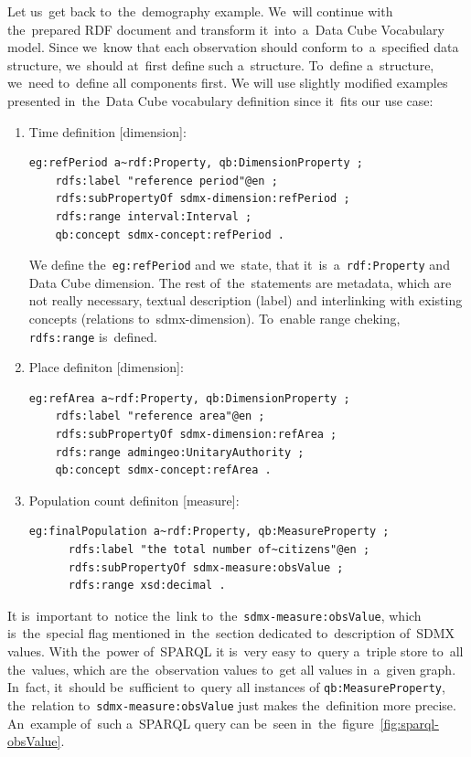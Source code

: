 Let us~get back to~the~demography example. We~will continue with the~prepared RDF
document and transform it~into~a~Data Cube Vocabulary model. Since we~know that each
observation should conform to~a~specified data structure, we~should at~first define
such a~structure. To~define a~structure, we~need to~define all components first.
We will use slightly modified examples presented in~the~Data Cube vocabulary
definition since it~fits our use case:

\begin{enumerate}
\item Time definition [dimension]:

\begin{verbatim}
eg:refPeriod a~rdf:Property, qb:DimensionProperty ;
    rdfs:label "reference period"@en ;
    rdfs:subPropertyOf sdmx-dimension:refPeriod ;
    rdfs:range interval:Interval ;
    qb:concept sdmx-concept:refPeriod .
\end{verbatim}

We define the~\texttt{eg:refPeriod} and we~state, that it~is~a~\texttt{rdf:Property} and Data Cube dimension.
The rest of~the~statements are metadata, which are not really necessary, textual description
(label) and interlinking with existing concepts (relations to~sdmx-dimension). To~enable range
cheking, \texttt{rdfs:range} is~defined.

\item Place definiton [dimension]:

\begin{verbatim}
eg:refArea a~rdf:Property, qb:DimensionProperty ;
    rdfs:label "reference area"@en ;
    rdfs:subPropertyOf sdmx-dimension:refArea ;
    rdfs:range admingeo:UnitaryAuthority ;
    qb:concept sdmx-concept:refArea .
\end{verbatim}

\item Population count definiton [measure]:
\begin{verbatim}
eg:finalPopulation a~rdf:Property, qb:MeasureProperty ;
      rdfs:label "the total number of~citizens"@en ;
      rdfs:subPropertyOf sdmx-measure:obsValue ;
      rdfs:range xsd:decimal .
\end{verbatim}
\end{enumerate}

It is~important to~notice the~link to~the~\texttt{sdmx-measure:obsValue}, which is~the~special flag
mentioned in~the~section dedicated to~description of~SDMX values. With the~power of~SPARQL
it is~very easy to~query a~triple store to~all the~values, which are the~observation values to~get
all values in~a~given graph. In~fact, it~should be~sufficient to~query all instances of
\texttt{qb:MeasureProperty}, the~relation to~\texttt{sdmx-measure:obsValue} just makes the~definition
more precise. An~example of~such a~SPARQL query can be~seen in~the~figure~\ref{fig:sparql-obsValue}.

